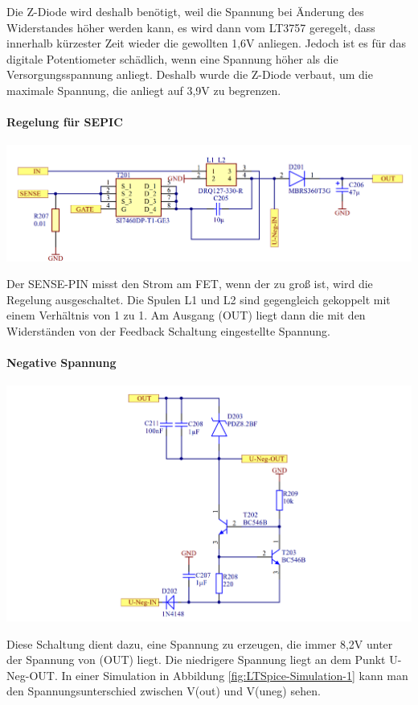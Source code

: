\documentclass[paper=a4, 12pt]{scrreprt}
\begin{document}
			Die Z-Diode wird deshalb benötigt, weil die Spannung bei Änderung des Widerstandes höher werden kann, es wird dann vom LT3757 geregelt, dass innerhalb kürzester Zeit wieder die gewollten 1,6V anliegen. Jedoch ist es für das digitale Potentiometer schädlich, wenn eine Spannung höher als die Versorgungsspannung anliegt. Deshalb wurde die Z-Diode verbaut, um die maximale Spannung, die anliegt auf 3,9V zu begrenzen.
			\paragraph{Regelung für SEPIC}\hfill \break
			\begin{adjustbox}{center,caption={Regelungsschaltung für LT3757},label={fig:regelung},nofloat=figure,vspace=\bigskipamount}
				\includegraphics[width=\textwidth]{img/Regelung_SEPIC.PNG}
			\end{adjustbox}
			Der SENSE-PIN misst den Strom am FET, wenn der zu groß ist, wird die Regelung ausgeschaltet. Die Spulen L1 und L2 sind gegengleich gekoppelt mit einem Verhältnis von 1 zu 1. Am Ausgang (OUT) liegt dann die mit den Widerständen von der Feedback Schaltung eingestellte Spannung.
			\pagebreak
			\paragraph{Negative Spannung}\hfill \break
			\begin{adjustbox}{center,caption={Schaltung für Versorgung von OPV der Stromquelle},label={fig:neg-spg},nofloat=figure,vspace=\bigskipamount}
				\includegraphics[width=\textwidth]{img/Negative_Spannung.PNG}
			\end{adjustbox}
			Diese Schaltung dient dazu, eine Spannung zu erzeugen, die immer 8,2V unter der Spannung von (OUT) liegt. Die niedrigere Spannung liegt an dem Punkt U-Neg-OUT. In einer Simulation in Abbildung \ref{fig:LTSpice-Simulation-1} kann man den Spannungsunterschied zwischen V(out) und V(uneg) sehen.
			\newpage
\end{document}
